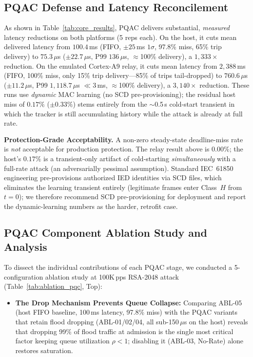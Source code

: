 \documentclass[journal]{IEEEtran}
\begin{document}
\subsection{PQAC Defense and Latency Reconcilement}
As shown in Table~\ref{tab:core_results}, PQAC delivers substantial, \emph{measured} latency reductions on both platforms (5 reps each). On the host, it cuts mean delivered latency from $100.4$\,ms (FIFO, $\pm 25$\,ms $1\sigma$, 97.8\% miss, 65\% trip delivery) to $75.3$\,$\mu$s ($\pm 22.7\,\mu$s, P99 $136\,\mu$s, $\approx$100\% delivery), a $1{,}333\times$ reduction. On the emulated Cortex-A9 relay, it cuts mean latency from $2{,}388$\,ms (FIFO, 100\% miss, only 15\% trip delivery---85\% of trips tail-dropped) to $760.6\,\mu$s ($\pm 11.2\,\mu$s, P99 $1{,}118.7\,\mu$s $\ll 3$\,ms, $\approx$100\% delivery), a $3{,}140\times$ reduction. These runs use \emph{dynamic} MAC learning (no SCD pre-provisioning); the residual host miss of $0.17\%$ ($\pm 0.33\%$) stems entirely from the $\sim$0.5\,s cold-start transient in which the tracker is still accumulating history while the attack is already at full rate.

\textbf{Protection-Grade Acceptability.} A non-zero steady-state deadline-miss rate is \emph{not} acceptable for production protection. The relay result above is $0.00\%$; the host's $0.17\%$ is a transient-only artifact of cold-starting \emph{simultaneously} with a full-rate attack (an adversarially pessimal assumption). Standard IEC~61850 engineering pre-provisions authorized IED identities via SCD files, which eliminates the learning transient entirely (legitimate frames enter Class~$H$ from $t=0$); we therefore recommend SCD pre-provisioning for deployment and report the dynamic-learning numbers as the harder, retrofit case.

\subsection{PQAC Component Ablation Study and Analysis}
To dissect the individual contributions of each PQAC stage, we conducted a 5-configuration ablation study at 100K\,pps RSA-2048 attack (Table~\ref{tab:ablation_pqc}, Top):
\begin{itemize}[leftmargin=*,noitemsep,topsep=1pt]
    \item \textbf{The Drop Mechanism Prevents Queue Collapse:} Comparing ABL-05 (host FIFO baseline, 100\,ms latency, 97.8\% miss) with the PQAC variants that retain flood dropping (ABL-01/02/04, all sub-150\,$\mu$s on the host) reveals that dropping 99\% of flood traffic at admission is the single most critical factor keeping queue utilization $\rho < 1$; disabling it (ABL-03, No-Rate) alone restores saturation.
\end{itemize}
\end{document}
